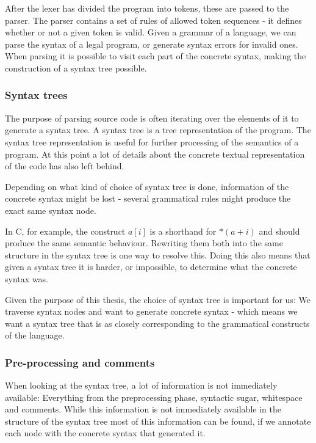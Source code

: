 \documentclass[11pt]{article}
\begin{document}
After the lexer has divided the program into tokens, these are passed to the parser. The parser contains a set of rules of allowed token sequences - it defines whether or not a given token is valid. Given a grammar of a language, we can parse the syntax of a legal program, or generate syntax errors for invalid ones. When parsing it is possible to visit each part of the concrete syntax, making the construction of a syntax tree possible.

\subsubsection{Syntax trees}
The purpose of parsing source code is often iterating over the elements of it to generate a syntax tree. A syntax tree is a tree representation of the program. The syntax tree representation is useful for further processing of the semantics of a program. At this point a lot of details about the concrete textual representation of the code has also left behind.

Depending on what kind of choice of syntax tree is done, information of the concrete syntax might be lost - several grammatical rules might produce the exact same syntax node.

In C, for example, the construct $a[i]$ is a shorthand for $*(a + i)$ and should produce the same semantic behaviour. Rewriting them both into the same structure in the syntax tree is one way to resolve this. Doing this also means that given a syntax tree it is harder, or impossible, to determine what the concrete syntax was.

Given the purpose of this thesis, the choice of syntax tree is important for us: We traverse syntax nodes and want to generate concrete syntax - which means we want a syntax tree that is as closely corresponding to the grammatical constructs of the language.

\subsubsection{Pre-processing and comments}
\label{PreprocessComments}
When looking at the syntax tree, a lot of information is not immediately available: Everything from the preprocessing phase, syntactic sugar, whitespace and comments. While this information is not immediately available in the structure of the syntax tree most of this information can be found, if we annotate each node with the concrete syntax that generated it. 

\clearpage
\end{document}
